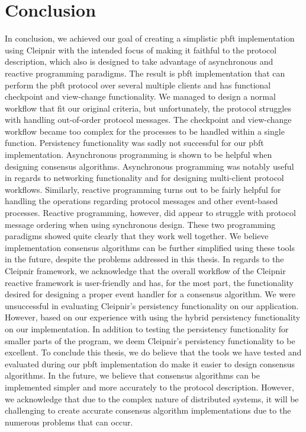 \section{Conclusion}
In conclusion, we achieved our goal of creating a simplistic \ac{pbft} implementation using Cleipnir with the intended focus of making it faithful to the protocol description, which also is designed to take advantage of asynchronous and reactive programming paradigms. The result is \ac{pbft} implementation that can perform the \ac{pbft} protocol over several multiple clients and has functional checkpoint and view-change functionality. We managed to design a normal workflow that fit our original criteria, but unfortunately, the protocol struggles with handling out-of-order protocol messages. The checkpoint and view-change workflow became too complex for the processes to be handled within a single function. Persistency functionality was sadly not successful for our \ac{pbft} implementation. Asynchronous programming is shown to be helpful when designing consensus algorithms. Asynchronous programming was notably useful in regards to networking functionality and for designing multi-client protocol workflows.
Similarly, reactive programming turns out to be fairly helpful for handling the operations regarding protocol messages and other event-based processes. Reactive programming, however, did appear to struggle with protocol message ordering when using synchronous design. These two programming paradigms showed quite clearly that they work well together. We believe implementation consensus algorithms can be further simplified using these tools in the future, despite the problems addressed in this thesis. In regards to the Cleipnir framework, we acknowledge that the overall workflow of the Cleipnir reactive framework is user-friendly and has, for the most part, the functionality desired for designing a proper event handler for a consensus algorithm. We were unsuccessful in evaluating Cleipnir’s persistency functionality on our application. However, based on our experience with using the hybrid persistency functionality on our implementation. In addition to testing the persistency functionality for smaller parts of the program, we deem Cleipnir’s persistency functionality to be excellent.
To conclude this thesis, we do believe that the tools we have tested and evaluated during our \ac{pbft} implementation do make it easier to design consensus algorithms. In the future, we believe that consensus algorithms can be implemented simpler and more accurately to the protocol description. However, we acknowledge that due to the complex nature of distributed systems, it will be challenging to create accurate consensus algorithm implementations due to the numerous problems that can occur.

